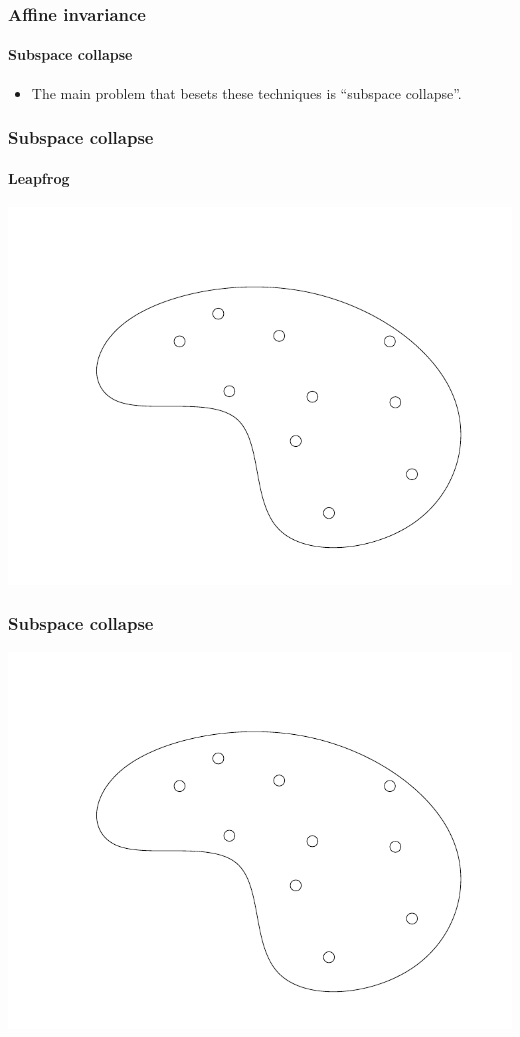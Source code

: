 \documentclass[]{beamer}
\begin{document}

\begin{frame}
  \frametitle{Affine invariance}
  \framesubtitle{Subspace collapse}
  \begin{itemize}
    \pause\item The main problem that besets these techniques is ``subspace collapse''.
  \end{itemize}
\end{frame}

\begin{frame}
  \frametitle{Subspace collapse}
  \framesubtitle{Leapfrog}
  \includegraphics[width=\textwidth,page=6]{figures/leapfrog}
\end{frame}

\begin{frame}
  \frametitle{Subspace collapse}
  \includegraphics[width=\textwidth,page=7]{figures/parallel_walk}
\end{frame}
\end{document}
